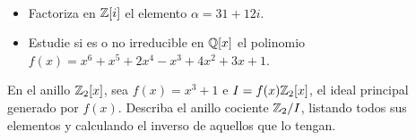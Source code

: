 \documentclass[12pt]{article}
\newcommand{\resetearcontador}{%
  \setcounter{ejercicio}{0} %
}
\begin{document}
    \begin{ejercicio}
        \ 
        \begin{itemize}
            \item Factoriza en $\mathbb{Z}[i]$ el elemento $\alpha = 31 + 12i$.
            \item Estudie si es o no irreducible en $\mathbb{Q}[x]$ el polinomio $f(x) = x^6 + x^5 + 2x^4 - x^3 + 4x^2 + 3x +1$.
        \end{itemize}
    \end{ejercicio}

    \begin{ejercicio}
        En el anillo $\mathbb{Z}_2[x]$, sea $f(x) = x^3 + 1$ e $I = f(x)\mathbb{Z}_2[x]$, el ideal principal generado por $f(x)$. Describa el anillo cociente $\mathbb{Z}_2/I$, listando todos sus elementos y calculando el inverso de aquellos que lo tengan.
    \end{ejercicio}

    \newpage
    \       %
    \newpage
    \resetearcontador
\end{document}
